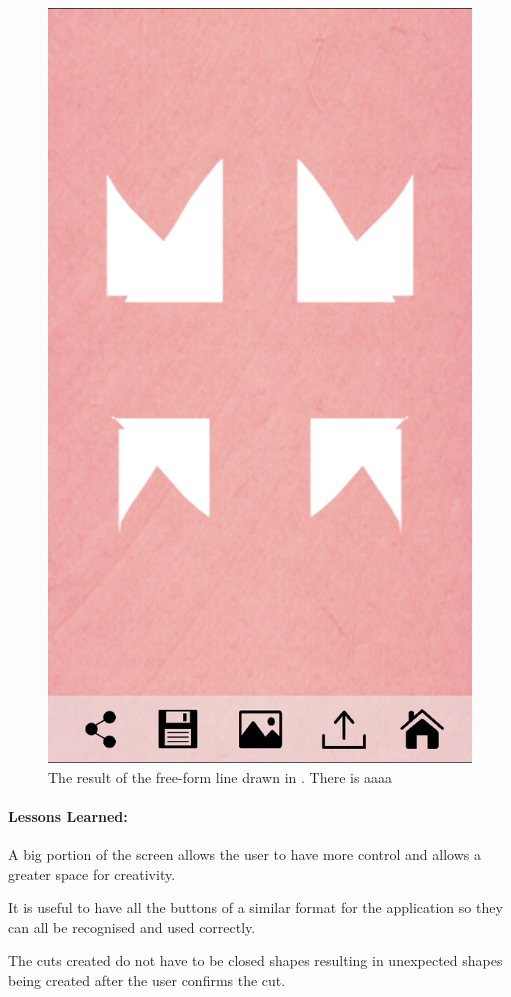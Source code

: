 \documentclass[11pt]{article}
\begin{document}
\begin{figure}[!ht]
\begin{minipage}{0.45\textwidth}
                            \includegraphics[width=0.7\linewidth]{Images/kirieCut.png}
                            \caption{The result of the free-form line drawn in . There is aaaa}
                            \label{fig:kirieCut}
                        \end{minipage}
                    \end{figure}
                
                \paragraph{Lessons Learned:}   
                A big portion of the screen allows the user to have more control and allows a greater space for creativity.
                
                It is useful to have all the buttons of a similar format for the application so they can all be recognised and used correctly.
                
                The cuts created do not have to be closed shapes resulting in unexpected shapes being created after the user confirms the cut. 
               
\end{document}
